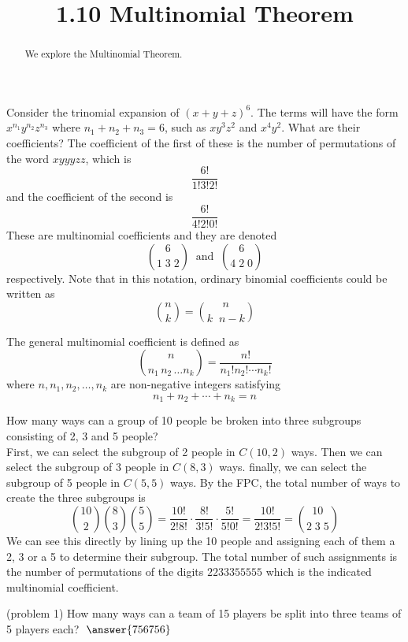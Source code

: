 \documentclass[handout]{ximera}
\title{1.10 Multinomial Theorem}
\begin{document}
\begin{abstract}
We explore the Multinomial Theorem.
\end{abstract}

\maketitle

Consider the trinomial expansion of $(x+y+z)^6$.  
The terms will have the form $x^{n_1}y^{n_2}z^{n_3}$ where $n_1+n_2+n_3 = 6$, such as  $xy^3z^2$ and $x^4y^2$.  What are their coefficients?
The coefficient of the first of these is the number of permutations of the word $xyyyzz$, which is
\[
\frac{6!}{1!3!2!}
\]
and the coefficient of the second is 
\[
\frac{6!}{4!2!0!}
\]
These are multinomial coefficients and they are denoted
\[
\binom{6}{1\; 3\; 2} \;\; \text{and} \;\; \binom{6}{4\; 2\; 0}
\]
respectively.
Note that in this notation, ordinary binomial coefficients could be written as 
\[
\binom{n}{k} = \binom{n}{k\;\; n-k}
\]

The general multinomial coefficient is defined as
\[
\binom{n}{n_1\, n_2 \, \dots n_k} = \frac{n!}{n_1! n_2! \cdots n_k!}
\]
where $n, n_1, n_2, \dots, n_k$ are non-negative integers satisfying
\[
n_1 + n_2 + \cdots + n_k = n
\]


\begin{example} How many ways can a group of 10 people be broken into three subgroups consisting 
of 2, 3 and 5 people?\\
First, we can select the subgroup of 2 people in $C(10, 2)$ ways. Then we can select the subgroup of 3 people
in $C(8,3)$ ways. finally, we can select the subgroup of 5 people in $C(5,5)$ ways. 
By the FPC, the total number of ways to create the three subgroups is
\[
\binom{10}{2} \binom{8}{3} \binom{5}{5} = \frac{10!}{2! 8!} \cdot \frac{8!}{3! 5!}
 \cdot \frac{5!}{5! 0!} = \frac{10!}{2! 3! 5!} = \binom{10}{2\;3\;5}
\]
We can see this directly by lining up the 10 people and assigning each of them a 
2, 3 or a 5 to determine their subgroup.
The total number of such assignments is the number of 
permutations of the digits
$2233355555$ which is the indicated multinomial coefficient.
\end{example}

\begin{problem}(problem 1)
How many ways can a team of 15 players be split into three teams of 5 players each? $\; \answer{756756}$
\end{problem}
\end{document}
